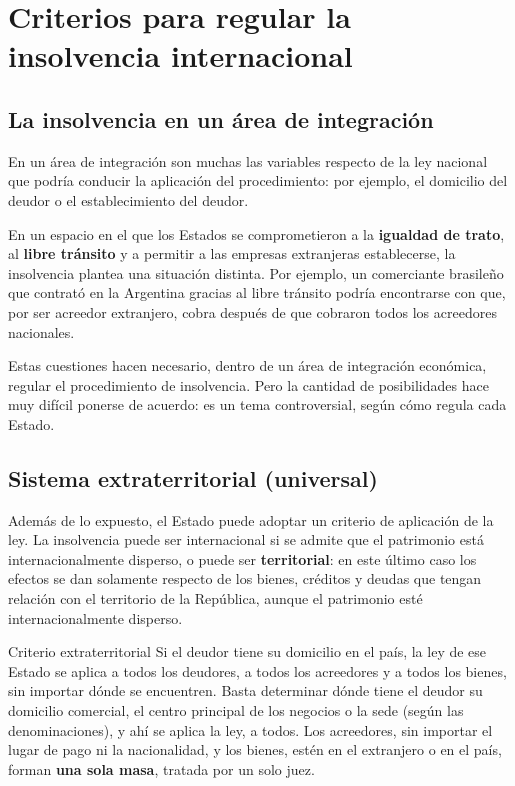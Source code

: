 \documentclass[12pt,oneside]{book}
\begin{document}
\chapter[Criterios para la insolvencia internacional]{Criterios para regular la insolvencia internacional}

\section{La insolvencia en un área de integración}

En un área de integración son muchas las variables respecto de la ley nacional que podría conducir la aplicación del procedimiento: por ejemplo, el domicilio del deudor o el establecimiento del deudor.

En un espacio en el que los Estados se comprometieron a la \textbf{igualdad de trato}, al \textbf{libre tránsito} y a permitir a las empresas extranjeras establecerse, la insolvencia plantea una situación distinta. Por ejemplo, un comerciante brasileño que contrató en la Argentina gracias al libre tránsito podría encontrarse con que, por ser acreedor extranjero, cobra después de que cobraron todos los acreedores nacionales.

Estas cuestiones hacen necesario, dentro de un área de integración económica, regular el procedimiento de insolvencia. Pero la cantidad de posibilidades hace muy difícil ponerse de acuerdo: es un tema controversial, según cómo regula cada Estado.

\section{Sistema extraterritorial (universal)}

Además de lo expuesto, el Estado puede adoptar un criterio de aplicación de la ley. La insolvencia puede ser internacional si se admite que el patrimonio está internacionalmente disperso, o puede ser \textbf{territorial}: en este último caso los efectos se dan solamente respecto de los bienes, créditos y deudas que tengan relación con el territorio de la República, aunque el patrimonio esté internacionalmente disperso.

\begin{definition}{Criterio extraterritorial}
Si el deudor tiene su domicilio en el país, la ley de ese Estado se aplica a todos los deudores, a todos los acreedores y a todos los bienes, sin importar dónde se encuentren. Basta determinar dónde tiene el deudor su domicilio comercial, el centro principal de los negocios o la sede (según las denominaciones), y ahí se aplica la ley, a todos. Los acreedores, sin importar el lugar de pago ni la nacionalidad, y los bienes, estén en el extranjero o en el país, forman \textbf{una sola masa}, tratada por un solo juez.
\end{definition}
\end{document}
